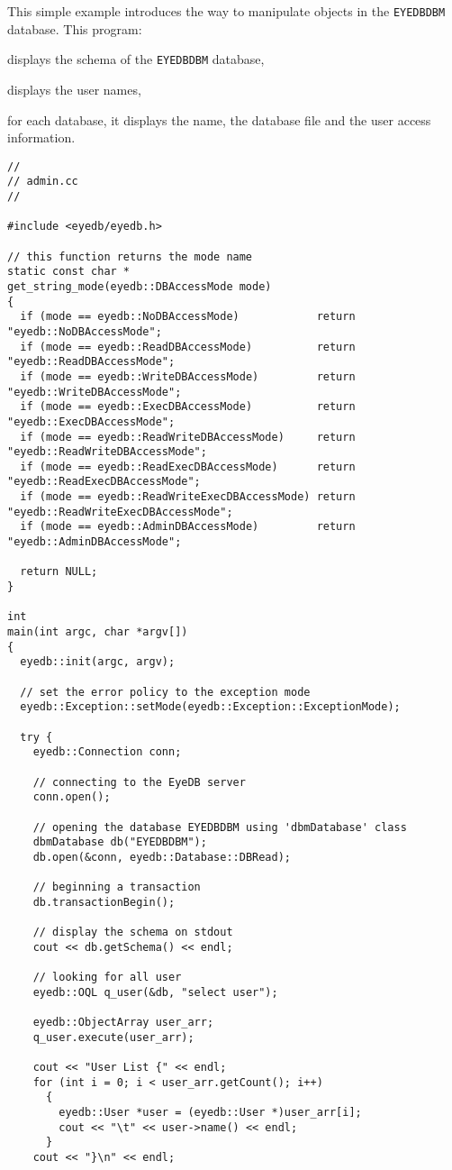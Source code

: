 This simple example introduces the way to manipulate objects in the
\texttt{EYEDBDBM} database. This program:
\be
\item displays the schema of the \texttt{EYEDBDBM} database,
\item displays the \eyedb user names,
\item for each database, it displays the name, the database file and
the user access information.
\ee
\verbsize
\begin{verbatim}
//
// admin.cc
//

#include <eyedb/eyedb.h>

// this function returns the mode name
static const char *
get_string_mode(eyedb::DBAccessMode mode)
{
  if (mode == eyedb::NoDBAccessMode)            return "eyedb::NoDBAccessMode";
  if (mode == eyedb::ReadDBAccessMode)          return "eyedb::ReadDBAccessMode";
  if (mode == eyedb::WriteDBAccessMode)         return "eyedb::WriteDBAccessMode";
  if (mode == eyedb::ExecDBAccessMode)          return "eyedb::ExecDBAccessMode";
  if (mode == eyedb::ReadWriteDBAccessMode)     return "eyedb::ReadWriteDBAccessMode";
  if (mode == eyedb::ReadExecDBAccessMode)      return "eyedb::ReadExecDBAccessMode";
  if (mode == eyedb::ReadWriteExecDBAccessMode) return "eyedb::ReadWriteExecDBAccessMode";
  if (mode == eyedb::AdminDBAccessMode)         return "eyedb::AdminDBAccessMode";

  return NULL;
}

int
main(int argc, char *argv[])
{
  eyedb::init(argc, argv);

  // set the error policy to the exception mode
  eyedb::Exception::setMode(eyedb::Exception::ExceptionMode);

  try {
    eyedb::Connection conn;

    // connecting to the EyeDB server
    conn.open();

    // opening the database EYEDBDBM using 'dbmDatabase' class
    dbmDatabase db("EYEDBDBM");
    db.open(&conn, eyedb::Database::DBRead);

    // beginning a transaction
    db.transactionBegin();

    // display the schema on stdout
    cout << db.getSchema() << endl;

    // looking for all user
    eyedb::OQL q_user(&db, "select user");

    eyedb::ObjectArray user_arr;
    q_user.execute(user_arr);

    cout << "User List {" << endl;
    for (int i = 0; i < user_arr.getCount(); i++)
      {
        eyedb::User *user = (eyedb::User *)user_arr[i];
        cout << "\t" << user->name() << endl;
      }
    cout << "}\n" << endl;


\end{verbatim}

